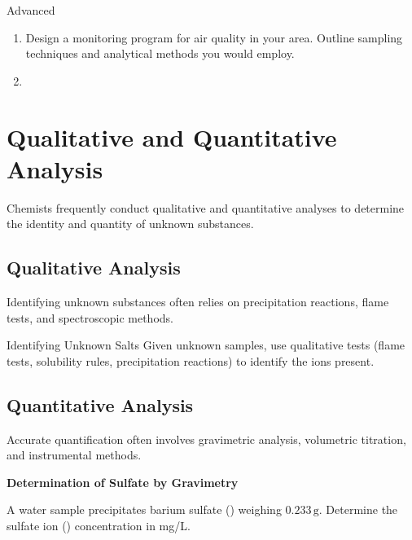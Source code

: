 \FloatBarrier

\begin{tieredquestions}{Advanced}
\begin{enumerate}
    \item Design a monitoring program for air quality in your area. Outline sampling techniques and analytical methods you would employ.
    \item {}
\end{enumerate}
\end{tieredquestions}

\section{Qualitative and Quantitative Analysis}
\FloatBarrier
\FloatBarrier
\FloatBarrier

Chemists frequently conduct qualitative and quantitative analyses to determine the identity and quantity of unknown substances.

\subsection{Qualitative Analysis}
\FloatBarrier
\FloatBarrier
\FloatBarrier

Identifying unknown substances often relies on precipitation reactions, flame tests, and spectroscopic methods.

\begin{investigation}{Identifying Unknown Salts}
Given unknown samples, use qualitative tests (flame tests, solubility rules, precipitation reactions) to identify the ions present.
\end{investigation}

\subsection{Quantitative Analysis}
\FloatBarrier
\FloatBarrier
\FloatBarrier

Accurate quantification often involves gravimetric analysis, volumetric titration, and instrumental methods.

\begin{example}
\textbf{Determination of Sulfate by Gravimetry}

A water sample precipitates barium sulfate () weighing $0.233\,\text{g}$. Determine the sulfate ion () concentration in mg/L.
\end{example}

